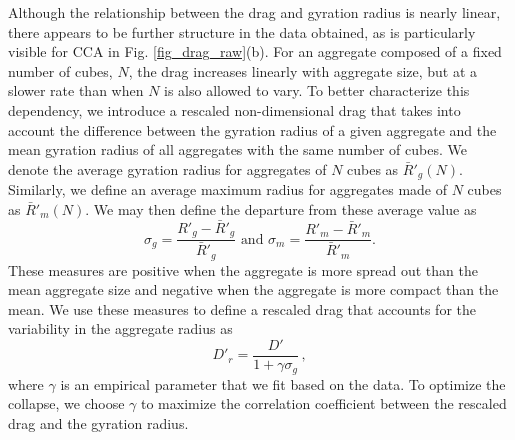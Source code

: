 Although the relationship between the drag and gyration radius is nearly linear, there appears to be further structure in the data obtained, as is particularly visible for CCA in Fig. \ref{fig_drag_raw}(b). For an aggregate composed of a fixed number of cubes, $N$, the drag increases linearly with aggregate size, but at a slower rate than when $N$ is also allowed to vary. To better characterize this dependency, we introduce a rescaled non-dimensional drag that takes into account the difference between the gyration radius of a given aggregate and the mean gyration radius of all aggregates with the same number of cubes.
We denote the average gyration radius for aggregates of $N$ cubes as $\bar{R}'_g(N)$. Similarly, 
we define an average maximum radius for aggregates made of $N$ cubes as $\bar{R}'_m(N)$. We may then define the departure from these average value as 
\[
\sigma_g = \frac{R'_g - \bar{R}'_g}{\bar{R}'_g} \text{\ \ \ \ \ \ and \ \ \ \ \ \ } \sigma_m = \frac{R'_m - \bar{R}'_m}{\bar{R}'_m}.
\]
These measures are positive when the aggregate is more spread out than the mean aggregate size and negative when the aggregate is more compact than the mean. We use these measures to define a rescaled drag that accounts for the variability in the aggregate radius as 
\begin{equation}
D'_r = \frac{D'}{1 + \gamma \sigma_g} \, , 
\label{def_drag_rescaled}
\end{equation}
where $\gamma$ is an empirical parameter that we fit based on the data. To optimize the collapse, we choose $\gamma$ to maximize the correlation coefficient between the rescaled drag and the gyration radius.  


